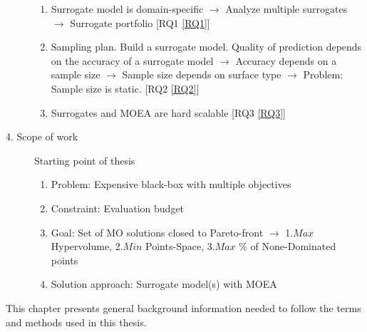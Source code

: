\begin{blockquote}
\begin{description}
\begin{enumerate}
                    \item Surrogate model is domain-specific $\rightarrow$ Analyze multiple surrogates $\rightarrow$ Surrogate portfolio [RQ1 \ref{RQ1}]
                    \item Sampling plan. Build a surrogate model. Quality of prediction depends on the accuracy of a surrogate model  $\rightarrow$ Accuracy depends on a sample size $\rightarrow$ Sample size depends on surface type $\rightarrow$ Problem: Sample size is static. [RQ2 \ref{RQ2}]
                    \item Surrogates and MOEA are hard scalable [RQ3 \ref{RQ3}]
                \end{enumerate}
            \item[4. Scope of work] Starting point of thesis
                \begin{enumerate}
                    \item Problem: Expensive black-box with multiple objectives
                    \item Constraint: Evaluation budget
                    \item Goal: Set of MO solutions closed to Pareto-front $\rightarrow$ 1.$Max$ Hypervolume, 2.$Min$ Points-Space, 3.$Max$ \% of None-Dominated points 
                    \item Solution approach: Surrogate model(s) with MOEA
                \end{enumerate}
        \end{description}
    \end{blockquote}

    This chapter presents general background information needed to follow the terms and methods used in this thesis. 

